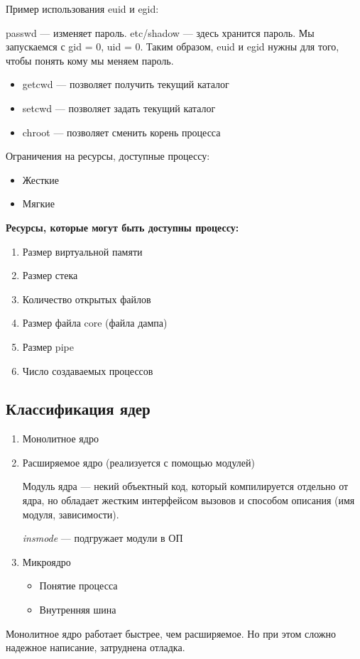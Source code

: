 Пример использования euid и egid:

passwd --- изменяет пароль. etc/shadow --- здесь хранится пароль. Мы запускаемся с gid = 0, uid =  0. Таким образом, euid и egid нужны для того, чтобы понять кому мы меняем пароль.

\begin{itemize}
\item getcwd --- позволяет получить текущий каталог
\item setcwd --- позволяет задать  текущий каталог
\item chroot --- позволяет сменить корень процесса
\end{itemize}

Ограничения на ресурсы, доступные процессу:
\begin{itemize}
\item Жесткие
\item Мягкие
\end{itemize}

\textbf{Ресурсы, которые могут быть доступны процессу:}
\begin{enumerate}
\item Размер виртуальной памяти
\item Размер стека
\item Количество открытых файлов
\item Размер файла core (файла дампа)
\item Размер pipe
\item Число создаваемых процессов
\end{enumerate}

\subsection*{Классификация ядер}

\begin{enumerate}
\item Монолитное ядро
\item Расширяемое ядро (реализуется с помощью модулей)

Модуль ядра --- некий объектный код, который компилируется отдельно от ядра, но обладает жестким интерфейсом вызовов и способом описания (имя модуля, зависимости).

\textit{insmode} --- подгружает модули в ОП

\item Микроядро
\begin{itemize}
\item Понятие процесса
\item Внутренняя шина
\end{itemize}
\end{enumerate}

Монолитное ядро работает быстрее, чем расширяемое. Но при этом сложно надежное написание, затруднена отладка.